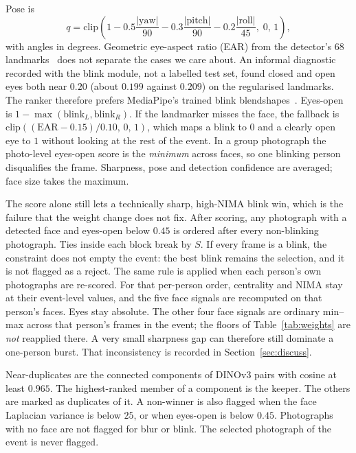 \documentclass[conference]{IEEEtran}
\begin{document}
Pose is
\begin{equation}
q = \mathrm{clip}\!\left(
1 - 0.5\frac{|\mathrm{yaw}|}{90}
  - 0.3\frac{|\mathrm{pitch}|}{90}
  - 0.2\frac{|\mathrm{roll}|}{45},\;
0,\,1\right),
\label{eq:pose}
\end{equation}
with angles in degrees. Geometric eye-aspect ratio (EAR) from the detector's
68 landmarks~\cite{soukupova2016eye} does not separate the cases we care about.
An informal diagnostic recorded with the blink module, not a labelled test
set, found closed and open eyes both near $0.20$ (about $0.199$ against
$0.209$) on the regularised landmarks. The ranker therefore prefers MediaPipe's
trained blink blendshapes~\cite{lugaresi2019mediapipe}. Eyes-open is
$1-\max(\mathrm{blink}_L,\mathrm{blink}_R)$. If the landmarker misses the face,
the fallback is $\mathrm{clip}((\mathrm{EAR}-0.15)/0.10,\,0,\,1)$, which maps
a blink to $0$ and a clearly open eye to $1$ without looking at the rest of
the event. In a group photograph the photo-level eyes-open score is the
\emph{minimum} across faces, so one blinking person disqualifies the frame.
Sharpness, pose and detection confidence are averaged; face size takes the
maximum.

The score alone still lets a technically sharp, high-NIMA blink win, which is
the failure that the weight change does not fix. After scoring, any photograph
with a detected face and eyes-open below $0.45$ is ordered after every
non-blinking photograph. Ties inside each block break by $S$. If every frame
is a blink, the constraint does not empty the event: the best blink remains
the selection, and it is not flagged as a reject. The same rule is applied
when each person's own photographs are re-scored. For that per-person order,
centrality and NIMA stay at their event-level values, and the five face
signals are recomputed on that person's faces. Eyes stay absolute. The other
four face signals are ordinary min--max across that person's frames in the
event; the floors of Table~\ref{tab:weights} are \emph{not} reapplied there.
A very small sharpness gap can therefore still dominate a one-person burst.
That inconsistency is recorded in Section~\ref{sec:discuss}.

Near-duplicates are the connected components of \mbox{DINOv3} pairs with cosine at
least $0.965$. The highest-ranked member of a component is the keeper. The
others are marked as duplicates of it. A non-winner is also flagged when the
face Laplacian variance is below $25$, or when eyes-open is below $0.45$.
Photographs with no face are not flagged for blur or blink. The selected
photograph of the event is never flagged.
\end{document}
